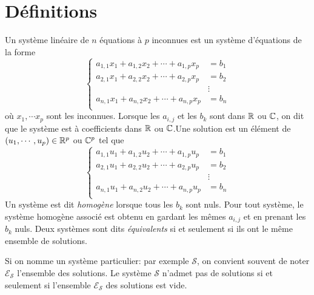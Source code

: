 

\section{Définitions}
\begin{defi}
Un système linéaire de $n$ équations à $p$ inconnues est un système d'équations de la forme
\begin{displaymath}
 \left\lbrace 
\begin{aligned}
 a_{1,1}x_1 + a_{1,2}x_2 + \cdots + a_{1,p}x_p &= b_1\\
 a_{2,1}x_1 + a_{2,2}x_2 + \cdots + a_{2,p}x_p &= b_2\\
                                               &\vdots \\
 a_{n,1}x_1 + a_{n,2}x_2 + \cdots + a_{n,p}x_p &= b_n\\
\end{aligned}
\right. 
\end{displaymath}
où $x_1,\cdots x_p$ sont les inconnues. Lorsque les $a_{i,j}$ et les $b_k$ sont dans $\mathbb{R}$ ou $\mathbb{C}$, on dit que le système est à coefficients dans $\mathbb{R}$ ou $\mathbb{C}$.\newline Une solution est un élément de $(u_1,\cdots,u_p)\in\mathbb{R}^p$ ou $\mathbb{C}^p$ tel que
\begin{displaymath}
 \left\lbrace 
\begin{aligned}
 a_{1,1}u_1 + a_{1,2}u_2 + \cdots + a_{1,p}u_p &= b_1\\
 a_{2,1}u_1 + a_{2,2}u_2 + \cdots + a_{2,p}u_p &= b_2\\
                                               &\vdots \\
 a_{n,1}u_1 + a_{n,2}u_2 + \cdots + a_{n,p}u_p &= b_n\\
\end{aligned}
\right. 
\end{displaymath}
Un système est dit \emph{homogène} lorsque tous les $b_k$ sont nuls. Pour tout système, le système homogène associé est obtenu en gardant les mêmes $a_{i,j}$ et en prenant les $b_k$ nuls.\newline
Deux systèmes sont dits \emph{équivalents}  si et seulement si ils ont le même ensemble de solutions.
\end{defi}
\begin{nota}
  Si on nomme un système particulier: par exemple $\mathcal{S}$, on convient souvent de noter $\mathcal{E}_{\mathcal{S}}$ l'ensemble des solutions. Le système $\mathcal{S}$ n'admet pas de solutions si et seulement si l'ensemble $\mathcal{E}_{\mathcal{S}}$ des solutions est vide.
\end{nota}

